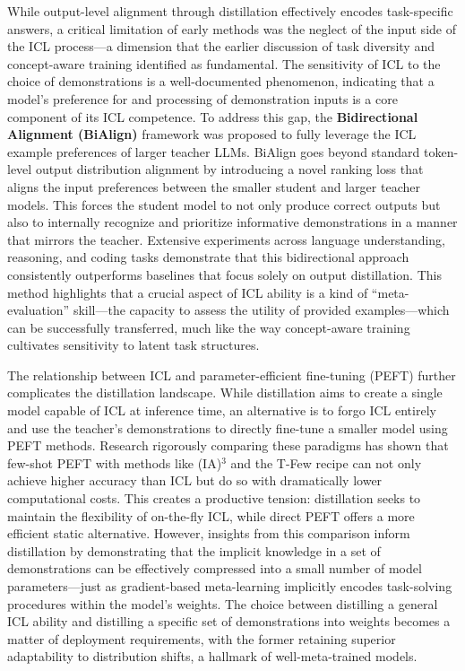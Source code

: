 \documentclass[11pt]{article}
\begin{document}
While output-level alignment through distillation effectively encodes task-specific answers, a critical limitation of early methods was the neglect of the input side of the ICL process---a dimension that the earlier discussion of task diversity and concept-aware training identified as fundamental. The sensitivity of ICL to the choice of demonstrations is a well-documented phenomenon, indicating that a model's preference for and processing of demonstration inputs is a core component of its ICL competence. To address this gap, the \textbf{Bidirectional Alignment (BiAlign)} framework \cite{ref122} was proposed to fully leverage the ICL example preferences of larger teacher LLMs. BiAlign goes beyond standard token-level output distribution alignment by introducing a novel ranking loss that aligns the input preferences between the smaller student and larger teacher models. This forces the student model to not only produce correct outputs but also to internally recognize and prioritize informative demonstrations in a manner that mirrors the teacher. Extensive experiments across language understanding, reasoning, and coding tasks demonstrate that this bidirectional approach consistently outperforms baselines that focus solely on output distillation. This method highlights that a crucial aspect of ICL ability is a kind of ``meta-evaluation'' skill---the capacity to assess the utility of provided examples---which can be successfully transferred, much like the way concept-aware training cultivates sensitivity to latent task structures.

The relationship between ICL and parameter-efficient fine-tuning (PEFT) further complicates the distillation landscape. While distillation aims to create a single model capable of ICL at inference time, an alternative is to forgo ICL entirely and use the teacher's demonstrations to directly fine-tune a smaller model using PEFT methods. Research rigorously comparing these paradigms \cite{ref30} has shown that few-shot PEFT with methods like (IA)\(^3\) and the T-Few recipe can not only achieve higher accuracy than ICL but do so with dramatically lower computational costs. This creates a productive tension: distillation seeks to maintain the flexibility of on-the-fly ICL, while direct PEFT offers a more efficient static alternative. However, insights from this comparison inform distillation by demonstrating that the implicit knowledge in a set of demonstrations can be effectively compressed into a small number of model parameters---just as gradient-based meta-learning implicitly encodes task-solving procedures within the model's weights. The choice between distilling a general ICL ability and distilling a specific set of demonstrations into weights becomes a matter of deployment requirements, with the former retaining superior adaptability to distribution shifts, a hallmark of well-meta-trained models.
\end{document}
